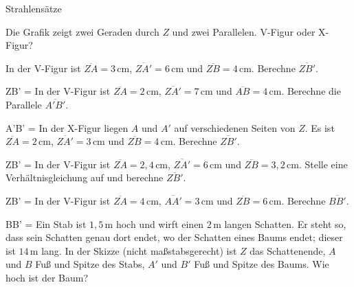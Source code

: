 \setcounter{aufgabe}{18}

\begin{aufgabe}{Strahlensätze}
\begin{teile}
\teil Die Grafik zeigt zwei Geraden durch $Z$ und zwei Parallelen. V-Figur oder X-Figur?  \\ 

\teil In der V-Figur ist $\overline{ZA} = 3\,\text{cm}$, $\overline{ZA'} = 6\,\text{cm}$ und $\overline{ZB} = 4\,\text{cm}$. Berechne $\overline{ZB'}$.

ZB' = \leerfeld[cm]
\teil In der V-Figur ist $\overline{ZA} = 2\,\text{cm}$, $\overline{ZA'} = 7\,\text{cm}$ und $\overline{AB} = 4\,\text{cm}$. Berechne die Parallele $\overline{A'B'}$.

A'B' = \leerfeld[cm]
\teil In der X-Figur liegen $A$ und $A'$ auf verschiedenen Seiten von $Z$. Es ist $\overline{ZA} = 2\,\text{cm}$, $\overline{ZA'} = 3\,\text{cm}$ und $\overline{ZB} = 4\,\text{cm}$. Berechne $\overline{ZB'}$.

ZB' = \leerfeld[cm]
\teil In der V-Figur ist $\overline{ZA} = 2{,}4\,\text{cm}$, $\overline{ZA'} = 6\,\text{cm}$ und $\overline{ZB} = 3{,}2\,\text{cm}$. Stelle eine Verhältnisgleichung auf und berechne $\overline{ZB'}$.

ZB' = \leerfeld[cm]
\teil In der V-Figur ist $\overline{ZA} = 4\,\text{cm}$, $\overline{AA'} = 3\,\text{cm}$ und $\overline{ZB} = 6\,\text{cm}$. Berechne $\overline{BB'}$.

BB' = \leerfeld[cm]
\teil Ein Stab ist $1{,}5\,\text{m}$ hoch und wirft einen $2\,\text{m}$ langen Schatten. Er steht so, dass sein Schatten genau dort endet, wo der Schatten eines Baums endet; dieser ist $14\,\text{m}$ lang. In der Skizze (nicht maßstabsgerecht) ist $Z$ das Schattenende, $A$ und $B$ Fuß und Spitze des Stabs, $A'$ und $B'$ Fuß und Spitze des Baums. Wie hoch ist der Baum?


\end{teile}
\end{aufgabe}
